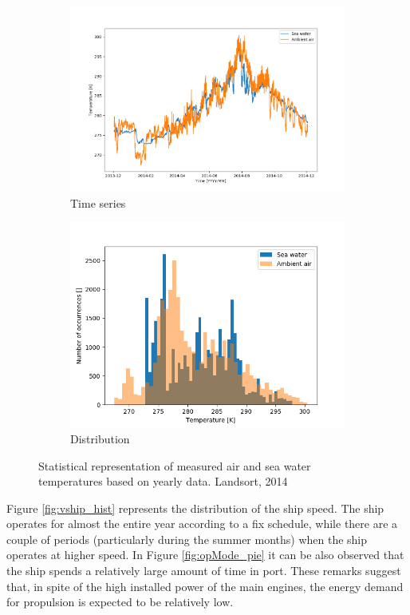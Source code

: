 \documentclass[preprint,12pt]{elsarticle}
\begin{document}
\begin{figure}[htbp]
	\centering
	\begin{subfigure}[b]{0.45\textwidth}
		\centering
		\includegraphics[width=0.999\linewidth]{Figures/Tsea_vs_time}
		\caption{Time series}
		\label{fig:TseaTairTIME}
	\end{subfigure}
	\begin{subfigure}[b]{0.45\textwidth}
		\centering
		\includegraphics[width=0.9\linewidth]{Figures/Tsea_hist}
		\caption{Distribution}
		\label{fig:TseaTairDIST}
	\end{subfigure}
	\caption{Statistical representation of measured air and sea water temperatures based on yearly data. Landsort, 2014}
	\label{fig:TseaTair}
\end{figure}


Figure \ref{fig:vship_hist} represents the distribution of the ship speed. The ship operates for almost  the entire year according to a fix schedule, while there are a couple of periods (particularly during the summer months) when the ship operates at higher speed. In Figure \ref{fig:opMode_pie} it can be also observed that the ship spends a relatively large amount of time in port. These remarks suggest that, in spite of the high installed power of the main engines, the energy demand for propulsion is expected to be relatively low.
\end{document}
